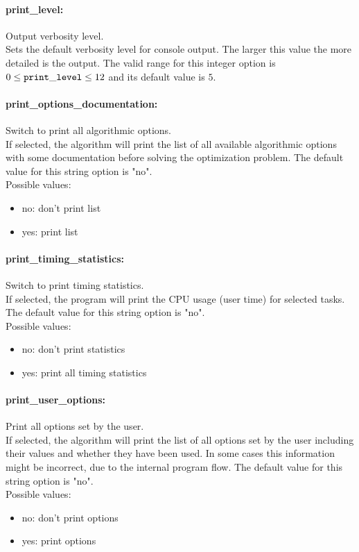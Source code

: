 \paragraph{print\_level:}\label{opt:print_level} Output verbosity level. \\
 Sets the default verbosity level for console output. The larger this value the more detailed is the output. The valid range for this integer option is
$0 \le {\tt print\_level } \le 12$
and its default value is $5$.


\paragraph{print\_options\_documentation:}\label{opt:print_options_documentation} Switch to print all algorithmic options. \\
 If selected, the algorithm will print the list of all available algorithmic options with some documentation before solving the optimization problem. The default value for this string option is "no".
\\ 
Possible values:
\begin{itemize}
   \item no: don't print list
   \item yes: print list
\end{itemize}

\paragraph{print\_timing\_statistics:}\label{opt:print_timing_statistics} Switch to print timing statistics. \\
 If selected, the program will print the CPU usage (user time) for selected tasks. The default value for this string option is "no".
\\ 
Possible values:
\begin{itemize}
   \item no: don't print statistics
   \item yes: print all timing statistics
\end{itemize}

\paragraph{print\_user\_options:}\label{opt:print_user_options} Print all options set by the user. \\
 If selected, the algorithm will print the list of all options set by the user including their values and whether they have been used.  In some cases this information might be incorrect, due to the internal program flow. The default value for this string option is "no".
\\ 
Possible values:
\begin{itemize}
   \item no: don't print options
   \item yes: print options
\end{itemize}

